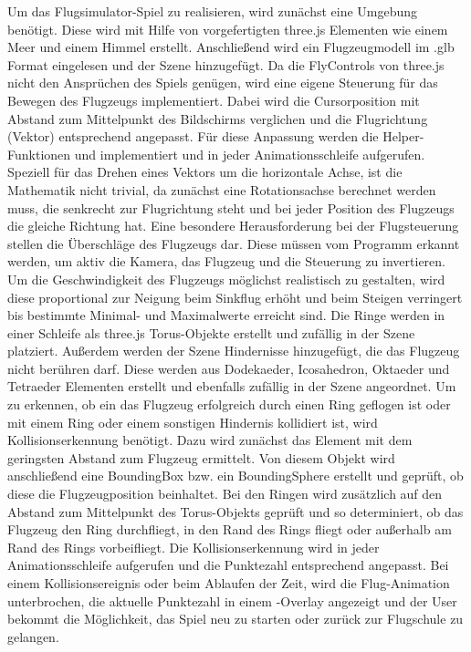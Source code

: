 Um das Flugsimulator-Spiel zu realisieren, wird zunächst eine Umgebung benötigt.
Diese wird mit Hilfe von vorgefertigten three.js Elementen wie einem Meer und einem Himmel erstellt.
Anschließend wird ein Flugzeugmodell im .glb Format eingelesen und der Szene hinzugefügt.
\newparagraph
Da die FlyControls von three.js nicht den Ansprüchen des Spiels genügen, wird eine eigene Steuerung für das Bewegen des Flugzeugs implementiert.
Dabei wird die Cursorposition mit Abstand zum Mittelpunkt des Bildschirms verglichen und die Flugrichtung (Vektor) entsprechend angepasst.
Für diese Anpassung werden die Helper-Funktionen  und  implementiert und in jeder Animationsschleife aufgerufen.
Speziell für das Drehen eines Vektors um die horizontale Achse, ist die Mathematik nicht trivial, da zunächst eine Rotationsachse berechnet werden muss, die senkrecht zur Flugrichtung steht und bei jeder Position des Flugzeugs die gleiche Richtung hat.
Eine besondere Herausforderung bei der Flugsteuerung stellen die Überschläge des Flugzeugs dar.
Diese müssen vom Programm erkannt werden, um aktiv die Kamera, das Flugzeug und die Steuerung zu invertieren.
Um die Geschwindigkeit des Flugzeugs möglichst realistisch zu gestalten, wird diese proportional zur Neigung beim Sinkflug erhöht und beim Steigen verringert bis bestimmte Minimal- und Maximalwerte erreicht sind.
\newparagraph
Die Ringe werden in einer Schleife als three.js Torus-Objekte erstellt und zufällig in der Szene platziert.
Außerdem werden der Szene Hindernisse hinzugefügt, die das Flugzeug nicht berühren darf.
Diese werden aus Dodekaeder, Icosahedron, Oktaeder und Tetraeder Elementen erstellt und ebenfalls zufällig in der Szene angeordnet.
\newparagraph
Um zu erkennen, ob ein das Flugzeug erfolgreich durch einen Ring geflogen ist oder mit einem Ring oder einem sonstigen Hindernis kollidiert ist, wird Kollisionserkennung benötigt.
Dazu wird zunächst das Element mit dem geringsten Abstand zum Flugzeug ermittelt.
Von diesem Objekt wird anschließend eine BoundingBox bzw. ein BoundingSphere erstellt und geprüft, ob diese die Flugzeugposition beinhaltet.
Bei den Ringen wird zusätzlich auf den Abstand zum Mittelpunkt des Torus-Objekts geprüft und so determiniert, ob das Flugzeug den Ring durchfliegt, in den Rand des Rings fliegt oder außerhalb am Rand des Rings vorbeifliegt.
Die Kollisionserkennung wird in jeder Animationsschleife aufgerufen und die Punktezahl entsprechend angepasst.
Bei einem Kollisionsereignis oder beim Ablaufen der Zeit, wird die Flug-Animation unterbrochen, die aktuelle Punktezahl in einem -Overlay angezeigt und der User bekommt die Möglichkeit, das Spiel neu zu starten oder zurück zur Flugschule zu gelangen.